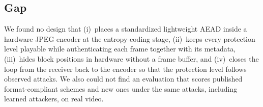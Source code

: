 \subsection{Gap}
We found no design that (i)~places a standardized lightweight AEAD inside a hardware JPEG encoder at the entropy-coding stage, (ii)~keeps every protection level playable while authenticating each frame together with its metadata, (iii)~hides block positions in hardware without a frame buffer, and (iv)~closes the loop from the receiver back to the encoder so that the protection level follows observed attacks. We also could not find an evaluation that scores published format-compliant schemes and new ones under the same attacks, including learned attackers, on real video.
